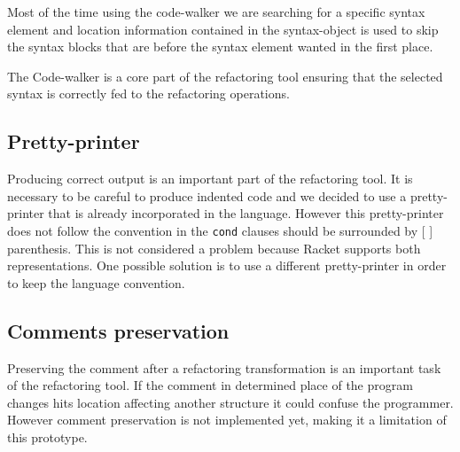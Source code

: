 Most of the time using the code-walker we are searching for a specific syntax element
and location information contained in the syntax-object  is used to skip the syntax
 blocks that are before the syntax element wanted in the first place.

The Code-walker is a core part of the refactoring tool ensuring that the selected
syntax is correctly fed to the refactoring operations. %



\subsection{Pretty-printer} %
Producing correct output is an important part of the refactoring tool.
It is necessary to be careful to produce indented code and we decided to use a pretty-printer
that is already incorporated in the language.
However this pretty-printer does not follow the convention in the {\tt cond} clauses
should be surrounded by [ ] parenthesis. This is not considered a problem because
Racket supports both representations.
One possible solution is to use a different pretty-printer in
order to keep the language convention.

\subsection{Comments preservation}
Preserving the comment after a refactoring transformation is an important task
of the refactoring tool. If the comment in determined place of the program
changes hits location affecting another structure it could confuse the programmer.
However comment preservation is not implemented yet, making it a limitation of
this prototype.

